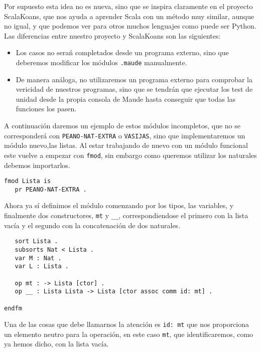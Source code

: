 Por supuesto esta idea no es nueva, sino que se inspira claramente en el proyecto ScalaKoans, que nos ayuda a aprender Scala con un método muy similar, aunque no igual, y que podemos ver para otros muchos lenguajes como puede ser Python. Las diferencias entre nuestro proyecto y ScalaKoans son las siguientes:\par
\begin{itemize}
\item Los casos no serań completados desde un programa externo, sino que deberemos modificar los módulos \texttt{.maude} manualmente.
\item De manera análoga, no utilizaremos un programa externo para comprobar la vericidad de nuestros programas, sino que se tendrán que ejecutar los test de unidad desde la propia consola de Maude hasta conseguir que todas las funciones los pasen.
\end{itemize}
A continuación daremos un ejemplo de estos módulos incompletos, que no se corresponderá con \texttt{PEANO-NAT-EXTRA} o \texttt{VASIJAS}, sino que implementaremos un módulo nuevo,las listas. Al estar trabajando de nuevo con un módulo funcional este vuelve a empezar con \verb"fmod", sin embargo como queremos utilizar los naturales debemos importarlos. \par

{\codesize
\begin{verbatim}
fmod Lista is
   pr PEANO-NAT-EXTRA .
\end{verbatim}
}

Ahora ya sí definimos el módulo comenzando por los tipos, las variables, y finalmente dos constructores, \verb"mt" y \verb"__", correspondiendose el primero con la lista vacía y el segundo con la concatenación de dos naturales. \par

{\codesize
\begin{verbatim}
   sort Lista .
   subsorts Nat < Lista .
   var M : Nat .
   var L : Lista .	

   op mt : -> Lista [ctor] .
   op __ : Lista Lista -> Lista [ctor assoc comm id: mt] .

endfm
\end{verbatim}
}

Una de las cosas que debe llamarnos la atención es \verb"id: mt" que nos proporciona un elemento neutro para la operación, en este caso \texttt{mt}, que identificaremos, como ya hemos dicho, con la lista vacía. \par

